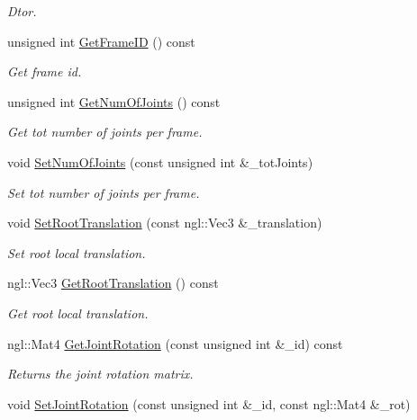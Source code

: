 \begin{DoxyCompactItemize}
\begin{DoxyCompactList}\small\item\em Dtor. \end{DoxyCompactList}\item 
unsigned int \hyperlink{class_frame_a09d802e0d0334639af5f2c722a6b01b4}{Get\+Frame\+ID} () const
\begin{DoxyCompactList}\small\item\em Get frame id. \end{DoxyCompactList}\item 
unsigned int \hyperlink{class_frame_ac84074496370db74643c16d34d466750}{Get\+Num\+Of\+Joints} () const
\begin{DoxyCompactList}\small\item\em Get tot number of joints per frame. \end{DoxyCompactList}\item 
void \hyperlink{class_frame_ab8d680e0de15f32079ba39654e0210f5}{Set\+Num\+Of\+Joints} (const unsigned int \&\+\_\+tot\+Joints)
\begin{DoxyCompactList}\small\item\em Set tot number of joints per frame. \end{DoxyCompactList}\item 
void \hyperlink{class_frame_a1324652e5954f13a6e641e528099c28d}{Set\+Root\+Translation} (const ngl\+::\+Vec3 \&\+\_\+translation)
\begin{DoxyCompactList}\small\item\em Set root local translation. \end{DoxyCompactList}\item 
ngl\+::\+Vec3 \hyperlink{class_frame_ac0ebd75466e20f6e478288e2f7bc4632}{Get\+Root\+Translation} () const
\begin{DoxyCompactList}\small\item\em Get root local translation. \end{DoxyCompactList}\item 
ngl\+::\+Mat4 \hyperlink{class_frame_a37f59e6b0f836892ab12ceb75ef36e53}{Get\+Joint\+Rotation} (const unsigned int \&\+\_\+id) const
\begin{DoxyCompactList}\small\item\em Returns the joint rotation matrix. \end{DoxyCompactList}\item 
void \hyperlink{class_frame_acdfdf30fe44c224feacd89c23933fd92}{Set\+Joint\+Rotation} (const unsigned int \&\+\_\+id, const ngl\+::\+Mat4 \&\+\_\+rot)

\end{DoxyCompactItemize}
